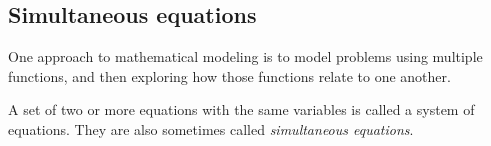 

\subsection{Simultaneous equations}

One approach to mathematical modeling is to model problems using multiple functions, and then exploring how those functions relate to one another. 

\begin{boxdef}
A set of two or more equations with the same variables is called a \gls{system of equations}. They are also sometimes called \textit{simultaneous equations}.
\end{boxdef}



